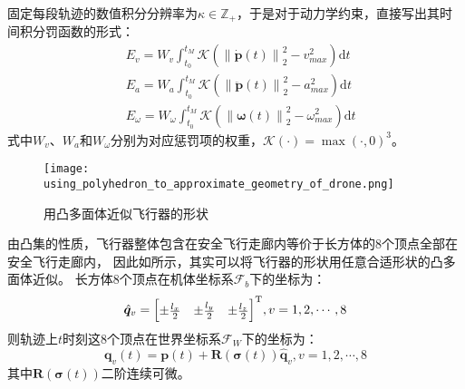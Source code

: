 固定每段轨迹的数值积分分辨率为$\kappa \in \mathbb{Z}_+$，于是对于动力学约束，直接写出其时间积分罚函数的形式：
\begin{align}
  &E_v = W_v \int_{t_0}^{t_M} \mathcal{K}(\left\|\dot{\bm{p}}(t)\right\|_2^2 - v_{max}^2)\mathrm{d}t 
  \label{equ:velocity_penalty} \\
  &E_a = W_a \int_{t_0}^{t_M} \mathcal{K}(\left\|\ddot{\bm{p}}(t)\right\|_2^2 - a_{max}^2)\mathrm{d}t 
  \label{equ:acceleration_penalty} \\
  &E_{\omega} = W_{\omega} \int_{t_0}^{t_M} \mathcal{K}(\left\|\bm{\omega}(t)\right\|_2^2 - {\omega}_{max}^2)\mathrm{d}t 
  \label{equ:angular_velocity_penalty}
\end{align}
式中$W_v$、$W_a$和$W_{\omega}$分别为对应惩罚项的权重，$\mathcal{K}(\cdot)=\max(\cdot, 0)^3$。

\begin{figure}[ht]
  \centering
  \texttt{[image: using\_polyhedron\_to\_approximate\_geometry\_of\_drone.png]}
  \caption{用凸多面体近似飞行器的形状}
  \label{fig:using_polyhedron_to_approximate_geometry_of_drone}
\end{figure}

由凸集的性质，飞行器整体包含在安全飞行走廊内等价于长方体的8个顶点全部在安全飞行走廊内，
因此如所示，其实可以将飞行器的形状用任意合适形状的凸多面体近似\cite{2021Fast}。
长方体8个顶点在机体坐标系$\mathscr{F}_b$下的坐标为：
\begin{equation}
  \hat{\bm{q}}_v = {
    \begin{bmatrix}
      \pm\frac{l_x}{2} & \pm\frac{l_y}{2} & \pm\frac{l_z}{2} 
    \end{bmatrix}
  }^{\text{T}}, v = 1, 2, \cdots, 8
  \label{equ:vertices_of_cuboid_in_body_frame}
\end{equation}
则轨迹上$t$时刻这8个顶点在世界坐标系$\mathscr{F}_W$下的坐标为：
\begin{equation}
  \bm{q}_v(t) = \bm{p}(t) + \bm{R}(\bm{\sigma}(t))\hat{\bm{q}}_v ,
  v = 1, 2, \cdots, 8
  \label{equ:vertices_of_cuboid_in_world_frame}
\end{equation}
其中$\bm{R}(\bm{\sigma}(t))$二阶连续可微。


